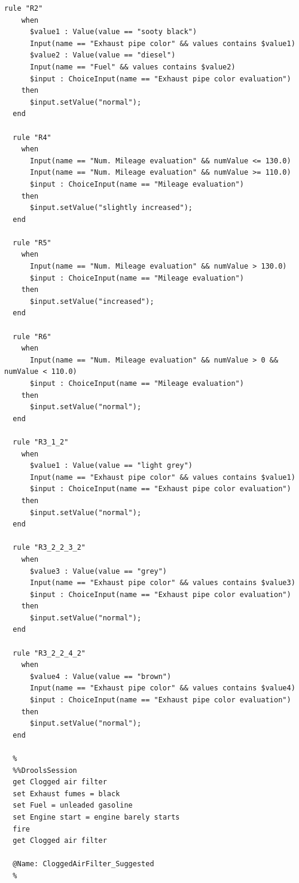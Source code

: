 \documentclass[a4paper,12pt]{report}
\begin{document}
\begin{lstlisting}[]
  rule "R2"
    when
      $value1 : Value(value == "sooty black")
      Input(name == "Exhaust pipe color" && values contains $value1)
      $value2 : Value(value == "diesel")
      Input(name == "Fuel" && values contains $value2)
      $input : ChoiceInput(name == "Exhaust pipe color evaluation")
    then
      $input.setValue("normal");
  end

  rule "R4"
    when
      Input(name == "Num. Mileage evaluation" && numValue <= 130.0)
      Input(name == "Num. Mileage evaluation" && numValue >= 110.0)
      $input : ChoiceInput(name == "Mileage evaluation")
    then
      $input.setValue("slightly increased");
  end

  rule "R5"
    when
      Input(name == "Num. Mileage evaluation" && numValue > 130.0)
      $input : ChoiceInput(name == "Mileage evaluation")
    then
      $input.setValue("increased");
  end

  rule "R6"
    when
      Input(name == "Num. Mileage evaluation" && numValue > 0 && numValue < 110.0)
      $input : ChoiceInput(name == "Mileage evaluation")
    then
      $input.setValue("normal");
  end

  rule "R3_1_2"
    when
      $value1 : Value(value == "light grey")
      Input(name == "Exhaust pipe color" && values contains $value1)
      $input : ChoiceInput(name == "Exhaust pipe color evaluation")
    then
      $input.setValue("normal");
  end

  rule "R3_2_2_3_2"
    when
      $value3 : Value(value == "grey")
      Input(name == "Exhaust pipe color" && values contains $value3)
      $input : ChoiceInput(name == "Exhaust pipe color evaluation")
    then
      $input.setValue("normal");
  end

  rule "R3_2_2_4_2"
    when
      $value4 : Value(value == "brown")
      Input(name == "Exhaust pipe color" && values contains $value4)
      $input : ChoiceInput(name == "Exhaust pipe color evaluation")
    then
      $input.setValue("normal");
  end

  %
  %%DroolsSession
  get Clogged air filter
  set Exhaust fumes = black
  set Fuel = unleaded gasoline
  set Engine start = engine barely starts
  fire
  get Clogged air filter

  @Name: CloggedAirFilter_Suggested
  %
    
  \end{lstlisting}
  
\end{document}
